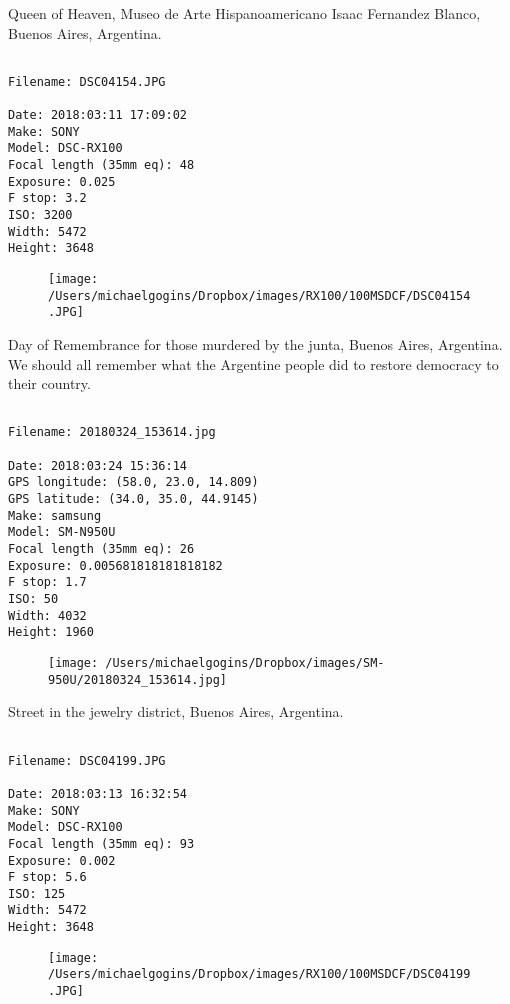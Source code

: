 \clearpage
\onecolumn
\noindent Queen of Heaven, Museo de Arte Hispanoamericano Isaac Fernandez Blanco, Buenos Aires, Argentina.
\noindent
\begin{lstlisting}

Filename: DSC04154.JPG

Date: 2018:03:11 17:09:02
Make: SONY
Model: DSC-RX100
Focal length (35mm eq): 48
Exposure: 0.025
F stop: 3.2
ISO: 3200
Width: 5472
Height: 3648
\end{lstlisting}
\clearpage

\begin{figure}
\texttt{[image: /Users/michaelgogins/Dropbox/images/RX100/100MSDCF/DSC04154.JPG]}
\end{figure}
    
\clearpage
\onecolumn
\noindent Day of Remembrance for those murdered by the junta, Buenos Aires, Argentina. We should all remember what the Argentine people did to restore democracy to their country.
\noindent
\begin{lstlisting}

Filename: 20180324_153614.jpg

Date: 2018:03:24 15:36:14
GPS longitude: (58.0, 23.0, 14.809)
GPS latitude: (34.0, 35.0, 44.9145)
Make: samsung
Model: SM-N950U
Focal length (35mm eq): 26
Exposure: 0.005681818181818182
F stop: 1.7
ISO: 50
Width: 4032
Height: 1960
\end{lstlisting}
\clearpage

\begin{figure}
\texttt{[image: /Users/michaelgogins/Dropbox/images/SM-950U/20180324\_153614.jpg]}
\end{figure}
    
\clearpage
\onecolumn
\noindent Street in the jewelry district, Buenos Aires, Argentina.
\noindent
\begin{lstlisting}

Filename: DSC04199.JPG

Date: 2018:03:13 16:32:54
Make: SONY
Model: DSC-RX100
Focal length (35mm eq): 93
Exposure: 0.002
F stop: 5.6
ISO: 125
Width: 5472
Height: 3648
\end{lstlisting}
\clearpage

\begin{figure}
\texttt{[image: /Users/michaelgogins/Dropbox/images/RX100/100MSDCF/DSC04199.JPG]}
\end{figure}
    
